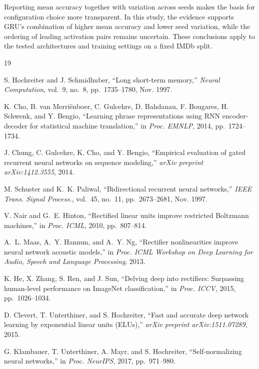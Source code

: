 \documentclass[conference,a4paper]{IEEEtran}
\begin{document}
Reporting mean accuracy together with variation across seeds
makes the basis for configuration choice more transparent.
In this study, the evidence supports GRU's combination of
higher mean accuracy and lower seed variation, while the
ordering of leading activation pairs remains uncertain.
These conclusions apply to the tested architectures and
training settings on a fixed IMDb split.
{\footnotesize
\begin{thebibliography}{19}
\setlength{\itemsep}{-2.2pt}


S. Hochreiter and J. Schmidhuber,
``Long short-term memory,''
\textit{Neural Computation}, vol.~9, no.~8, pp.~1735--1780, Nov. 1997.

K. Cho, B. van Merri\"{e}nboer, C. Gulcehre, D. Bahdanau, F. Bougares,
H. Schwenk, and Y. Bengio,
``Learning phrase representations using RNN encoder-decoder for statistical
machine translation,''
in \textit{Proc. EMNLP}, 2014, pp.~1724--1734.

J. Chung, C. Gulcehre, K. Cho, and Y. Bengio,
``Empirical evaluation of gated recurrent neural networks on sequence
modeling,''
\textit{arXiv preprint arXiv:1412.3555}, 2014.

M. Schuster and K.~K. Paliwal,
``Bidirectional recurrent neural networks,''
\textit{IEEE Trans. Signal Process.}, vol.~45, no.~11,
pp.~2673--2681, Nov. 1997.


V. Nair and G.~E. Hinton,
``Rectified linear units improve restricted Boltzmann machines,''
in \textit{Proc. ICML}, 2010, pp.~807--814.

A.~L. Maas, A.~Y. Hannun, and A.~Y. Ng,
``Rectifier nonlinearities improve neural network acoustic models,''
in \textit{Proc. ICML Workshop on Deep Learning for Audio, Speech and
Language Processing}, 2013.

K. He, X. Zhang, S. Ren, and J. Sun,
``Delving deep into rectifiers: Surpassing human-level performance on
ImageNet classification,''
in \textit{Proc. ICCV}, 2015, pp.~1026--1034.

D. Clevert, T. Unterthiner, and S. Hochreiter,
``Fast and accurate deep network learning by exponential linear units
(ELUs),''
\textit{arXiv preprint arXiv:1511.07289}, 2015.

G. Klambauer, T. Unterthiner, A. Mayr, and S. Hochreiter,
``Self-normalizing neural networks,''
in \textit{Proc. NeurIPS}, 2017, pp.~971--980.


\end{thebibliography}}
\end{document}
